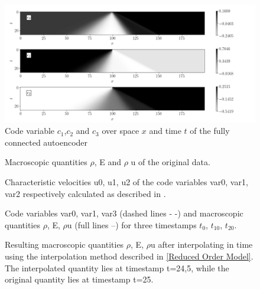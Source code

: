 \documentclass[12pt, a4paper]{article}
\begin{document}
\begin{figure}[!htbp]
	\includegraphics[width=\linewidth]{Figures/Code.png}
	\caption{Code variable $c_1$,$c_2$ and $c_3$ over space $x$ and time $t$ of the fully connected autoencoder}
	\label{Fig:Code_Fully}
\end{figure}
\begin{figure}
	
	\caption{Macroscopic quantities $\rho$, E and $\rho$ u of the original data.}
\end{figure}
\begin{figure}[!htbp]
	
	\caption{Characteristic velocities u0, u1, u2 of the code variables var0, var1, var2 respectively calculated as described in .}
\end{figure}
\begin{figure}[!htbp]
	
	\caption{Code variables var0, var1, var3 (dashed lines - -) and macroscopic quantities $\rho$, E, $\rho$u (full lines --) for three timestamps $t_0$, $t_{10}$, $t_{20}$.}
\end{figure}
\begin{figure}[!htbp]
	
	\caption{Resulting macroscopic quantities $\rho$, E, $\rho$u after interpolating in time using the interpolation method described in \ref{Reduced Order Model}. The interpolated quantity lies at timestamp t=24,5, while the original quantity lies at timestamp t=25.}
\end{figure}
\end{document}
